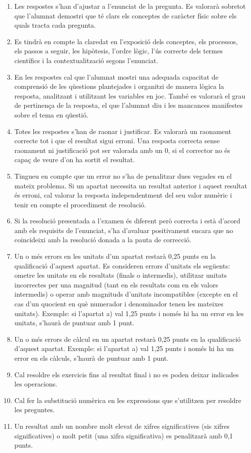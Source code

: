 \begin{enumerate}
  \item Les respostes s'han d'ajustar a l'enunciat de la pregunta. Es valorarà sobretot que l'alumnat demostri que té clars els conceptes de caràcter físic sobre els quals tracta cada pregunta.
  \item Es tindrà en compte la claredat en l'exposició dels conceptes, els processos, els passos a seguir, les hipòtesis, l'ordre lògic, l'ús correcte dels termes científics i la contextualització segons l'enunciat.
  \item En les respostes cal que l'alumnat mostri una adequada capacitat de comprensió de les qüestions plantejades i organitzi de manera lògica la resposta, analitzant i utilitzant les variables en joc. També es valorarà el grau de pertinença de la resposta, el que l'alumnat diu i les mancances manifestes sobre el tema en qüestió.
  \item Totes les respostes s'han de raonar i justificar. Es valorarà un raonament correcte tot i que el resultat sigui erroni. Una resposta correcta sense raonament ni justificació pot ser valorada amb un 0, si el corrector no és capaç de veure d'on ha sortit el resultat.
  \item Tingueu en compte que un error no s'ha de penalitzar dues vegades en el mateix problema. Si un apartat necessita un resultat anterior i aquest resultat és erroni, cal valorar la resposta independentment del seu valor numèric i tenir en compte el procediment de resolució.
  \item Si la resolució presentada a l'examen és diferent però correcta i està d'acord amb els requisits de l'enunciat, s'ha d'avaluar positivament encara que no coincideixi amb la resolució donada a la pauta de correcció.
  \item Un o més errors en les unitats d'un apartat restarà 0,25 punts en la qualificació d'aquest apartat. Es consideren errors d'unitats els següents: ometre les unitats en els resultats (finals o intermedis), utilitzar unitats incorrectes per una magnitud (tant en els resultats com en els valors intermedis) o operar amb magnituds d'unitats incompatibles (excepte en el cas d'un quocient en què numerador i denominador tenen les mateixes unitats). Exemple: si l'apartat a) val 1,25 punts i només hi ha un error en les unitats, s'haurà de puntuar amb 1 punt.
  \item Un o més errors de càlcul en un apartat restarà 0,25 punts en la qualificació d'aquest apartat. Exemple: si l'apartat a) val 1,25 punts i només hi ha un error en els càlculs, s'haurà de puntuar amb 1 punt.
  \item Cal resoldre els exercicis fins al resultat final i no es poden deixar indicades les operacions.
  \item Cal fer la substitució numèrica en les expressions que s'utilitzen per resoldre les preguntes.
  \item Un resultat amb un nombre molt elevat de xifres significatives (sis xifres significatives) o molt petit (una xifra significativa) es penalitzarà amb 0,1 punts.
\end{enumerate}
